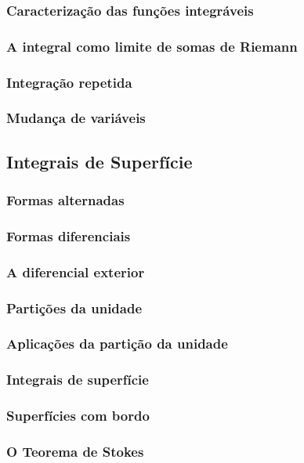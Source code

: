\documentclass{article}
\theoremstyle{theorem}
\theoremstyle{lemma}
\theoremstyle{definition}
\theoremstyle{remark}
\begin{document}
   \subsubsection{Caracterização das funções integráveis}
   \subsubsection{A integral como limite de somas de Riemann}
   \subsubsection{Integração repetida}
   \subsubsection{Mudança de variáveis}

\subsection{ Integrais de Superfície}
   \subsubsection{Formas alternadas}
   \subsubsection{Formas diferenciais}
   \subsubsection{A diferencial exterior}
   \subsubsection{Partições da unidade}
   \subsubsection{Aplicações da partição da unidade}
   \subsubsection{Integrais de superfície}
   \subsubsection{Superfícies com bordo}
   \subsubsection{O Teorema de Stokes}
\end{document}
